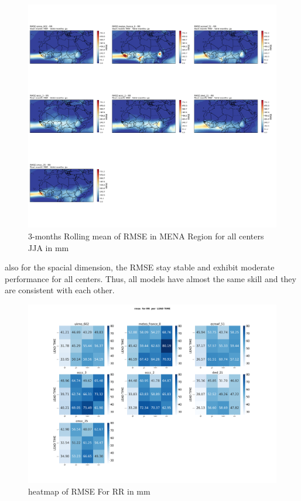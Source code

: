 \begin{figure}[H]
\centering
\includegraphics[scale=0.3]{plots/det/rmse/rmse_jja_RR.png}
\caption{3-months Rolling mean of RMSE in MENA Region for all centers JJA in mm}
\end{figure}

also for the spacial dimension, the RMSE stay stable and exhibit moderate performance for all centers. Thus, all models have almost the same skill and they are consistent with each other.

\begin{figure}[H]
\centering
\includegraphics[scale=0.3]{plots/det/rmse/rmse_RR_mena.png}
\caption{heatmap of RMSE For RR in mm}
\end{figure}


